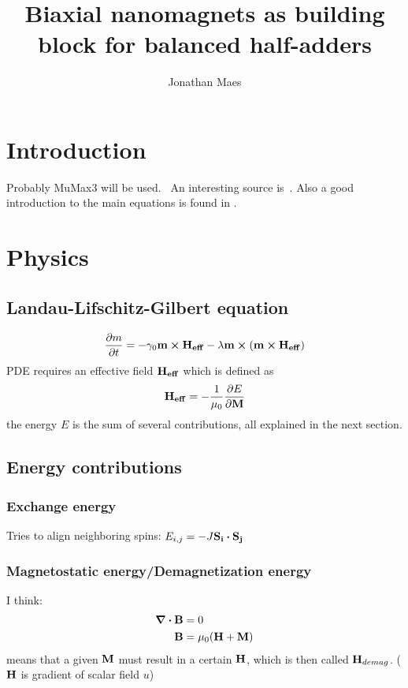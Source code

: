 \documentclass[10pt,a4paper]{article}
\author{Jonathan Maes}
\title{Biaxial nanomagnets as building block for balanced half-adders}
\begin{document}
	\begin{titlingpage}
	\maketitle
	\end{titlingpage}

	\newpage
	
	\tableofcontents
	\newpage

	\section{Introduction}
	Probably MuMax3 will be used.~\cite{MuMax3}
	An interesting source is~\cite{NML_Carlton}.
	Also a good introduction to the main equations is found in \cite{MuMax3_advances}.
	
	\section{Physics}
	\subsection{Landau-Lifschitz-Gilbert equation}
	\begin{equation}
		\frac{\partial m}{\partial t} = - \gamma_0 \vb{m} \cross \vb{H_{eff}} - \lambda \vb{m} \cross (\vb{m} \cross \vb{H_{eff}})
	\end{equation}
	PDE requires an effective field $\vb{H_{eff}}$ which is defined as
	\begin{equation}
		\vb{H_{eff}} = - \frac{1}{\mu_0} \frac{\partial E}{\partial \vb{M}}
	\end{equation}
	the energy $E$ is the sum of several contributions, all explained in the next section.
	
	\subsection{Energy contributions}
	\subsubsection{Exchange energy}
	Tries to align neighboring spins:
	$E_{i,j} = -J \vb{S_i} \vdot \vb{S_j}$
	\subsubsection{Magnetostatic energy/Demagnetization energy}
	I think:
	\begin{align}
		\div{\vb{B}} &= 0 \\
		\vb{B} &= \mu_0 (\vb{H} + \vb{M})
	\end{align}
	means that a given $\vb{M}$ must result in a certain $\vb{H}$, which is then called $\vb{H}_{demag}$.
	($\vb{H}$ is gradient of scalar field $u$)
	
\end{document}
